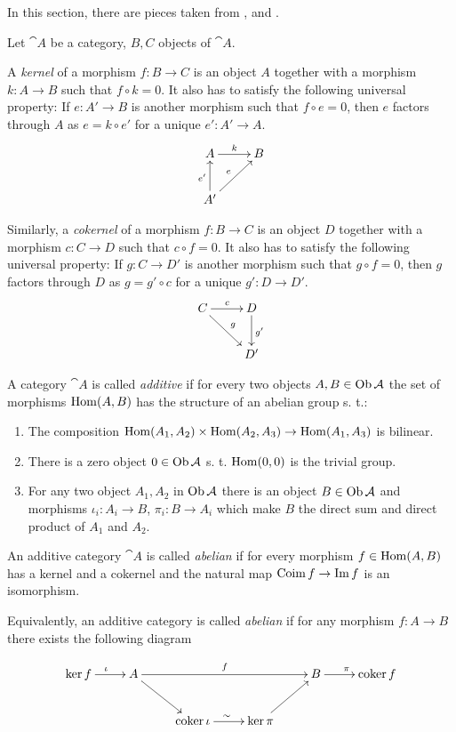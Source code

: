 In this section, there are pieces taken from \cite{weibel}, \cite{huybrechts} and \cite{working}.

\begin{definition}
    Let $\cat{A}$ be a category, $B, C$ objects of $\cat{A}$.

    A \textit{kernel} of a morphism $f:B \rightarrow C$ is an object $A$ together with a morphism $k: A \rightarrow B$ such that $f \circ k = 0$.
    It also has to satisfy the following universal property:
    If $e: A' \rightarrow B$ is another morphism such that $f \circ e = 0$, then $e$ factors through $A$ as $e = k \circ e'$ for a unique $e': A' \rightarrow A$.
    \[
        \xymatrix{
            A \ar[r]^k & B \\
            A' \ar[ru]^e \ar[u]^{e'}
        }
    \]

    Similarly, a \textit{cokernel} of a morphism $f: B \rightarrow C$ is an object $D$ together with a morphism $c: C \rightarrow D$ such that $c \circ f = 0$.
    It also has to satisfy the following universal property:
    If $g:C \rightarrow D'$ is another morphism such that $g \circ f = 0$, then $g$ factors through $D$ as $g = g' \circ c$ for a unique $g': D \rightarrow D'$.
    \[
        \xymatrix{
            C \ar[r]^c \ar[rd]^g & D \ar[d]^{g'} \\
            & D'
        }
    \]
\end{definition}

\begin{definition}\label{def:addCat}
    A category $\cat{A}$ is called \textit{additive} if for every two objects $A,B \in \operatorname{Ob}\mathcal{A}$ the set of morphisms $\operatorname{Hom}(A,B)$ has the structure of an abelian group s. t.:
    \begin{enumerate}[label=(\roman*)]
        \item The composition $\operatorname{Hom}(A_1,A_2) \times \operatorname{Hom}(A_2,A_3) \rightarrow \operatorname{Hom}(A_1,A_3)$ is bilinear.
        \item There is a zero object $0 \in \operatorname{Ob}\mathcal{A}$ s. t. $\operatorname{Hom}(0,0)$ is the trivial group.
        \item For any two object $A_1, A_2$ in $\operatorname{Ob}\mathcal{A}$ there is an object $B \in \operatorname{Ob}\mathcal{A}$ and morphisms $\iota_i: A_i \rightarrow B$, $\pi_i:B \rightarrow A_i$ which make $B$ the direct sum and direct product of $A_1$ and $A_2$.
    \end{enumerate}
\end{definition}

\begin{definition}\label{def:abCat}
    An additive category $\cat{A}$ is called \textit{abelian} if for every morphism $f \in \operatorname{Hom}(A,B)$ has a kernel and a cokernel and the natural map $\operatorname{Coim} f \rightarrow \operatorname{Im} f$ is an isomorphism.

    Equivalently, an additive category is called \textit{abelian} if for any morphism $f:A\rightarrow B$ there exists the following diagram
    
    \[
        \xymatrix{
            \ker f \ar[r]^{\iota} & A \ar[rrr]^{f} \ar[rd] & & & B \ar[r]^{\pi} & \coker f \\
            & & \coker \iota \ar[r]^{\sim} & \ker\pi \ar[ur] & & 
        }
    \]
\end{definition}

